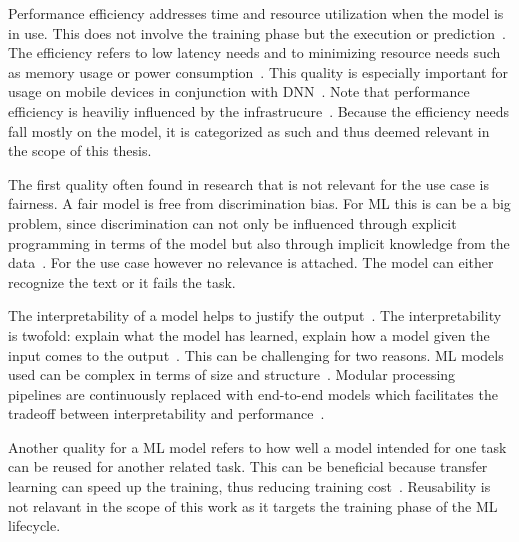 Performance efficiency addresses time and resource utilization when the model is in use.
This does not involve the training phase but the execution or
prediction~\citep{siebert_construction_2021}.
The efficiency refers to low latency needs and to minimizing resource needs such as memory
usage or power consumption~\citep{nakamichi_requirements-driven_2020, siebert_construction_2021,
sourvanos_challenges_2018}.
This quality is especially important for usage on mobile devices in conjunction with
\ac{DNN}~\citep{sourvanos_challenges_2018, niu_26ms_2019}.
Note that performance efficiency is heaviliy influenced by the
infrastrucure~\citep{nakamichi_requirements-driven_2020, siebert_construction_2021}.
Because the efficiency needs fall mostly on the model, it is categorized as such and thus deemed
relevant in the scope of this thesis.

The first quality often found in research that is not relevant for the use case is fairness.
A fair model is free from discrimination bias.
For \ac{ML} this is can be a big problem, since discrimination can not only be influenced through
explicit programming in terms of the model but also through implicit knowledge from the
data~\citep{vogelsang_requirements_2019}.
For the use case however no relevance is attached.
The model can either recognize the text or it fails the task.

The interpretability of a model helps to justify the output~\citep{ashmore_assuring_2021}.
The interpretability is twofold: explain what the model has learned, explain how a model given the
input comes to the output~\citep{vogelsang_requirements_2019}.
This can be challenging for two reasons.
\ac{ML} models used can be complex in terms of size and structure~\citep{ashmore_assuring_2021}.
Modular processing pipelines are continuously replaced with end-to-end
models which facilitates the tradeoff between interpretability and
performance~\cite{arpteg_software_2018}.

Another quality for a \ac{ML} model refers to how well a model intended for one task can be reused
for another related task.
This can be beneficial because transfer learning can speed up the training, thus reducing training
cost~\citep{ashmore_assuring_2021}.
Reusability is not relavant in the scope of this work as it targets the training phase of the
\ac{ML} lifecycle.
